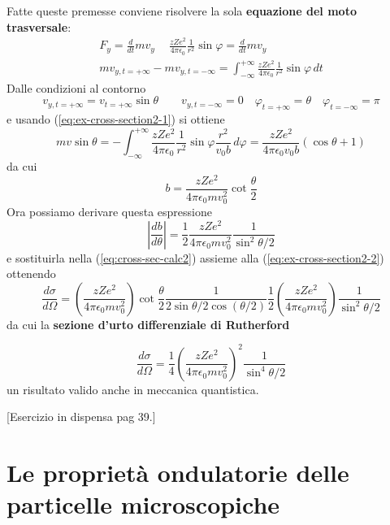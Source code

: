Fatte queste premesse conviene risolvere la sola \textbf{equazione del moto trasversale}:
\begin{gather*}
	F_y = \frac{d}{dt}m v_y \quad \ \frac{zZe^2}{4 \pi \epsilon_0}\frac{1}{r^2}\sin \varphi = \frac{d}{dt}mv_y\\
	mv_{y,t= + \infty} - mv_{y,t = - \infty} = \int_{- \infty}^{+\infty} \frac{zZe^2}{4 \pi \epsilon_0}\frac{1}{r^2}\sin \varphi\,dt
\end{gather*}
Dalle condizioni al contorno
\[
	v_{y,t= + \infty} = v_{t= + \infty}\sin \theta \qquad v_{y,t = - \infty} = 0 \quad \varphi_{t = +\infty} = \theta \quad \varphi_{t = - \infty} = \pi
\]
e usando (\ref{eq:ex-cross-section2-1}) si ottiene
\[
	mv \sin \theta = - \int_{- \infty}^{+ \infty} \frac{zZe^2}{4 \pi \epsilon_0}\frac{1}{r^2}\sin \varphi
	\frac{r^2}{v_0b}\,d \varphi = \frac{zZe^2}{4 \pi \epsilon_0 v_0 b}(\cos \theta + 1)
\]
da cui
\begin{equation}
	b = \frac{zZe^2}{4 \pi \epsilon_0 m v^2_0} \cot \frac{\theta}{2}
	\label{eq:ex-cross-section2-3}
\end{equation}
Ora possiamo derivare questa espressione
\[
	\left | \frac{db}{d \theta}\right | = \frac{1}{2}\frac{zZe^2}{4 \pi \epsilon_0 m v^2_0}\frac{1}{\sin^2{\theta/2}}
\]
e sostituirla nella (\ref{eq:cross-sec-calc2}) assieme alla (\ref{eq:ex-cross-section2-2}) ottenendo
\[
	\frac{d \sigma }{d \Omega} = \left( \frac{zZe^2}{4 \pi \epsilon_0m v^2_0}\right) \cot{\frac{\theta}{2}}\frac{1}{2 \sin{\theta / 2 \cos (\theta /2)}}\frac{1}{2}\left( \frac{zZe^2}{4 \pi \epsilon_0m v^2_0}\right)\frac{1}{\sin^2{\theta/2}}
\]
da cui la \textbf{sezione d'urto differenziale di Rutherford}

\begin{equation}
	\frac{d \sigma }{d \Omega} = \frac{1}{4} \left( \frac{zZe^2}{4 \pi \epsilon_0m v^2_0}\right) ^2\frac{1}{\sin^4{\theta / 2}}
\end{equation}
un risultato valido anche in meccanica quantistica.

[Esercizio in dispensa pag 39.]

\section{Le proprietà ondulatorie delle particelle microscopiche}\label{sec:proprieta-ondulatorie-delle-particelle-microscopiche}

